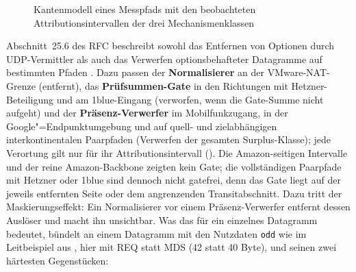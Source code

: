 \begin{figure}[H]
    \caption[Kantenmodell eines Messpfads]{Kantenmodell eines Messpfads mit den beobachteten
      Attributions\-intervallen der drei
        Mechanismenklassen}
    \label{fig:kantenmodell}
\end{figure}

Abschnitt~25.6 des RFC beschreibt sowohl das Entfernen von Optionen durch UDP-Vermittler als auch das
Verwerfen optionsbehafteter Datagramme auf bestimmten Pfaden \cite[Sec.~25.6]{rfc9868}. Dazu passen der
\textbf{Normalisierer} an der VMware-NAT-Grenze (entfernt), das \textbf{Prüfsummen-Gate} in den
Richtungen mit Hetzner-Beteiligung und am 1blue-Eingang (verworfen, wenn die Gate-Summe nicht aufgeht)
und der \textbf{Präsenz-Verwerfer} im Mobilfunkzugang, in der Google"=Endpunkt\-umgebung und auf quell-
und ziel\-abhängigen interkontinentalen Paarpfaden (Verwerfen der gesamten Surplus-Klasse); jede
Verortung gilt nur für ihr Attributionsintervall (). Die Amazon-seitigen
Intervalle und der reine Amazon-Backbone zeigten kein Gate; die vollständigen Paarpfade mit Hetzner oder
1blue sind dennoch nicht gatefrei, denn das Gate liegt auf der jeweils entfernten Seite oder dem
angrenzenden Transitabschnitt. Dazu tritt der Maskierungseffekt: Ein Normalisierer vor einem
Präsenz-Verwerfer entfernt dessen Auslöser und macht ihn unsichtbar. Was das für ein einzelnes
Datagramm bedeutet, bündelt  an einem Datagramm mit den Nutzdaten \texttt{odd}
wie im Leitbeispiel aus , hier mit REQ statt MDS (42 statt 40 Byte), und seinen zwei
härtesten Gegenstücken:

